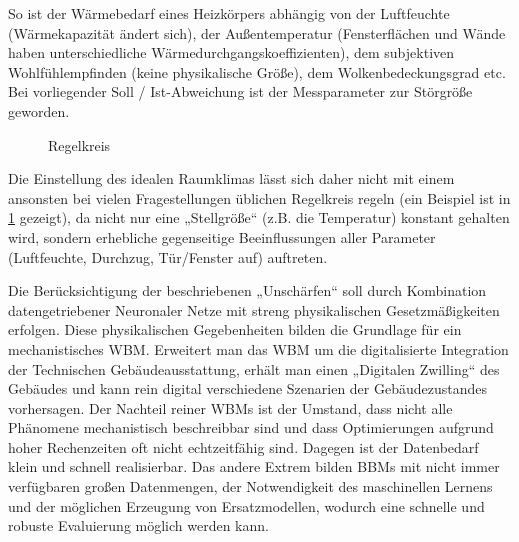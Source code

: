 So ist der Wärmebedarf eines Heizkörpers abhängig von der Luftfeuchte (Wärmekapazität ändert sich), der Außentemperatur (Fensterflächen und Wände haben unterschiedliche Wärmedurchgangskoeffizienten), dem subjektiven Wohlfühlempfinden (keine physikalische Größe), dem Wolkenbedeckungsgrad etc. Bei vorliegender Soll / Ist-Abweichung ist der Messparameter zur Störgröße geworden.

\begin{figure}[htbp]
    \centering
    \caption{\label{fig-regelkreis}Regelkreis}
\end{figure}

Die Einstellung des idealen Raumklimas lässt sich daher nicht mit einem ansonsten bei vielen Fragestellungen üblichen Regelkreis regeln (ein Beispiel ist in \cref{fig-regelkreis} gezeigt), da nicht nur eine „Stellgröße“ (z.B. die Temperatur) konstant gehalten wird, sondern erhebliche gegenseitige Beeinflussungen aller Parameter (Luftfeuchte, Durchzug, Tür/Fenster auf) auftreten. 

Die Berücksichtigung der beschriebenen „Unschärfen“ soll durch Kombination datengetriebener Neuronaler Netze mit streng physikalischen Gesetzmäßigkeiten erfolgen. Diese physikalischen Gegebenheiten bilden die Grundlage für ein mechanistisches \gls{WBM}. Erweitert man das \gls{WBM} um die digitalisierte Integration der Technischen Gebäudeausstattung, erhält man einen „Digitalen Zwilling“ des Gebäudes und kann rein digital verschiedene Szenarien der Gebäudezustandes vorhersagen. Der Nachteil reiner \glspl{WBM} ist der Umstand, dass nicht alle Phänomene mechanistisch beschreibbar sind und dass Optimierungen aufgrund hoher Rechenzeiten oft nicht echtzeitfähig sind. Dagegen ist der Datenbedarf klein und schnell realisierbar. Das andere Extrem bilden \glspl{BBM} mit nicht immer verfügbaren großen Datenmengen, der Notwendigkeit des maschinellen Lernens und der möglichen Erzeugung von Ersatzmodellen, wodurch eine schnelle und robuste Evaluierung möglich werden kann. 


